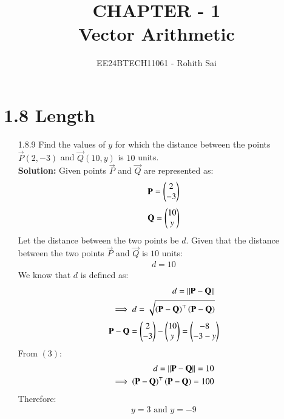 \documentclass[journal]{IEEEtran}
\begin{document}

\vspace{3cm}

\title{CHAPTER - 1\\Vector Arithmetic}
\author{EE24BTECH11061 - Rohith Sai}
\maketitle

\renewcommand{\thefigure}{\theenumi}
\renewcommand{\thetable}{\theenumi}

\section{1.8 Length}
\begin{enumerate}
\item [1.8.9] Find the values of $y$ for which the distance between the points $\vec{P}(2, -3)$ and $\vec{Q}(10, y)$ is $10$ units.\\
\textbf{Solution:}
Given points $\vec{P}$ and $\vec{Q}$ are represented as:
\begin{align}
    \mathbf{P} = \begin{pmatrix}
2 \\ -3
\end{pmatrix}
\end{align}
\begin{align}
    \mathbf{Q} = \begin{pmatrix}
    10 \\ y
    \end{pmatrix}
\end{align}
Let the distance between the two points be $d$.
Given that the distance between the two points $\vec{P}$ and $\vec{Q}$ is $10$ units:
\begin{align}
    d=10
\end{align}
We know that $d$ is defined as:
\begin{align}
    d = \left\vert\left\vert\mathbf{P}-\mathbf{Q}\right\vert\right\vert\\
    \implies d = \sqrt{{\left(\mathbf{P}-\mathbf{Q}\right)}^\top\left(\mathbf{P}-\mathbf{Q}\right)}
\end{align}
\begin{align}
    \mathbf{P} - \mathbf{Q} = \begin{pmatrix}2\\-3\end{pmatrix} - \begin{pmatrix}10\\y\end{pmatrix} = \begin{pmatrix}-8\\-3-y\end{pmatrix}\\
\end{align}
From $(3)$:
\begin{align}
    d = \left\vert\left\vert\mathbf{P}-\mathbf{Q}\right\vert\right\vert = 10\\
    \implies {\ensuremath{\left(\mathbf{P}-\mathbf{Q}\right)}}^\top\left(\mathbf{P}-\mathbf{Q}\right) = 100
\end{align}
Therefore:
\begin{align}
    y = 3 \text{ and } y = -9
\end{align}
\end{enumerate}
\end{document}
